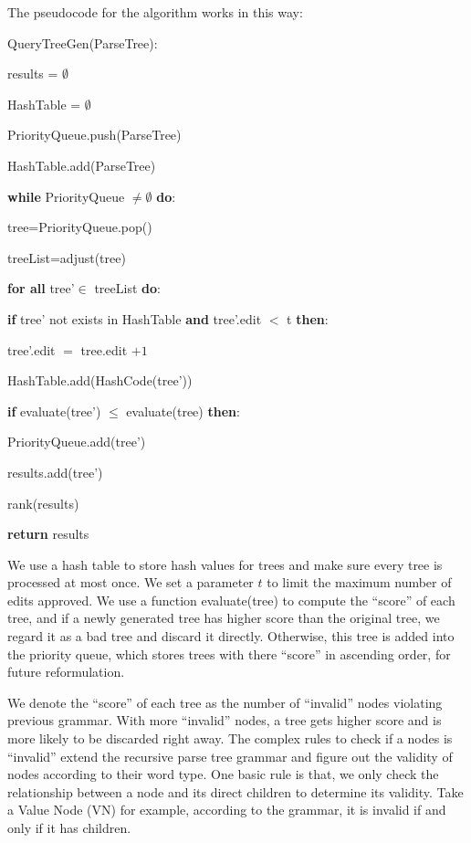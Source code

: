 \documentclass[twocolumn]{article}
\begin{document}
\begin{enumerate}
	The pseudocode for the algorithm works in this way:
	
	QueryTreeGen(ParseTree):
		
	results = $\emptyset$
	
	HashTable = $\emptyset$
	
	PriorityQueue.push(ParseTree)
	
	HashTable.add(ParseTree)
	
	\textbf{while} PriorityQueue $\neq\emptyset$ \textbf{do}:
	
	\hspace{1em} tree=PriorityQueue.pop()
	
	\hspace{1em} treeList=adjust(tree)
	
	\hspace{1em} \textbf{for all} tree'$\in$ treeList \textbf{do}:
	
	\hspace{2em} \textbf{if} tree' not exists in HashTable \textbf{and} tree'.edit $<$ t \textbf{then}:
	
	\hspace{3em} tree'.edit $=$ tree.edit $+1$
	
	\hspace{3em} HashTable.add(HashCode(tree'))
	
	\hspace{3em} \textbf{if} evaluate(tree') $\leq$ evaluate(tree) \textbf{then}:
	
	\hspace{4em} PriorityQueue.add(tree')
	
	\hspace{4em} results.add(tree')
	
	rank(results)
	
	\textbf{return} results
	
	We use a hash table to store hash values for trees and make sure every tree is processed at most once. We set a parameter $t$ to limit the maximum number of edits approved. We use a function evaluate(tree) to compute the ``score'' of each tree, and if a newly generated tree has higher score than the original tree, we regard it as a bad tree and discard it directly. Otherwise, this tree is added into the priority queue, which stores trees with there ``score'' in ascending order, for future reformulation.
	
	We denote the ``score'' of each tree as the number of ``invalid'' nodes violating previous grammar. With more ``invalid'' nodes, a tree gets higher score and is more likely to be discarded right away. The complex rules to check if a nodes is ``invalid'' extend the recursive parse tree grammar and figure out the validity of nodes according to their word type. One basic rule is that, we only check the relationship between a node and its direct children to determine its validity. Take a Value Node (VN) for example, according to the grammar, it is invalid if and only if it has children.
	

\end{enumerate}
\end{document}
